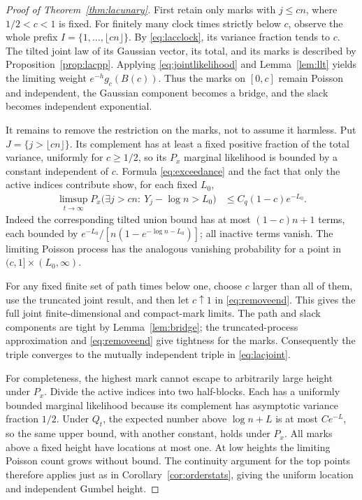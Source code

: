 \documentclass[11pt,a4paper]{article}
\numberwithin{equation}{section}
\theoremstyle{definition}
\theoremstyle{remark}
\begin{document}
\begin{proof}[Proof of Theorem~\ref{thm:lacunary}]
First retain only marks with $j\le cn$, where $1/2<c<1$ is fixed.
For finitely many clock times strictly below $c$, observe the whole
prefix $I=\{1,\ldots,\lfloor cn\rfloor\}$. By
\eqref{eq:lacclock}, its variance fraction tends to $c$.
The tilted joint law of its Gaussian vector, its total, and its marks
is described by Proposition~\ref{prop:lacpp}. Applying
\eqref{eq:jointlikelihood} and Lemma~\ref{lem:llt} yields the
limiting weight $e^{-h}g_c(B(c))$. Thus the marks on $[0,c]$ remain
Poisson and independent, the Gaussian component becomes a bridge,
and the slack becomes independent exponential.

It remains to remove the restriction on the marks, not to assume it
harmless. Put $J=\{j>\lfloor cn\rfloor\}$. Its complement has at
least a fixed positive fraction of the total variance, uniformly for
$c\ge1/2$, so its $P_x$ marginal likelihood is bounded by a constant
independent of $c$. Formula \eqref{eq:exceedance} and the fact that
only the active indices contribute show, for each fixed $L_0$,
\begin{align}
 \limsup_{t\to\infty}P_x\big(
  \exists j>cn:\ Y_j-\log n>L_0\big)
 &\le C_q(1-c)e^{-L_0}. \label{eq:removeend}
\end{align}
Indeed the corresponding tilted union bound has at most
$(1-c)n+1$ terms, each bounded by
$e^{-L_0}/[n(1-e^{-\log n-L_0})]$; all inactive terms vanish.
The limiting Poisson process has the analogous vanishing probability
for a point in $(c,1]\times(L_0,\infty)$.

For any fixed finite set of path times below one, choose $c$ larger
than all of them, use the truncated joint result, and then let
$c\uparrow1$ in \eqref{eq:removeend}. This gives the full joint
finite-dimensional and compact-mark limits. The path and slack
components are tight by Lemma~\ref{lem:bridge}; the truncated-process
approximation and \eqref{eq:removeend} give tightness for the marks.
Consequently the triple converges to the mutually independent triple
in \eqref{eq:lacjoint}.

For completeness, the highest mark cannot escape to arbitrarily large
height under $P_x$. Divide the active indices into two half-blocks.
Each has a uniformly bounded marginal likelihood because its
complement has asymptotic variance fraction $1/2$. Under $Q_t$, the
expected number above $\log n+L$ is at most $C e^{-L}$, so the same
upper bound, with another constant, holds under $P_x$. All marks above
a fixed height have locations at most one. At low heights the limiting
Poisson count grows without bound. The continuity argument for the top
points therefore applies just as in Corollary~\ref{cor:orderstats},
giving the uniform location and independent Gumbel height.
\end{proof}
\end{document}

